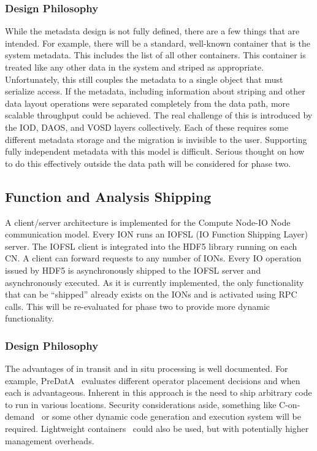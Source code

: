 \documentclass[conference]{IEEEtran} \pdfpagewidth=8.5in
\begin{document}
\subsubsection{Design Philosophy}

While the metadata design is not fully defined, there are a few things that
are intended. For example, there will be a standard, well-known container that
is the system metadata. This includes the list of all other containers. This
container is treated like any other data in the system and striped as
appropriate. Unfortunately, this still couples the metadata to a single object
that must serialize access.  If the metadata, including information about
striping and other data layout operations were separated completely from the
data path, more scalable throughput could be achieved.  The real challenge of
this is introduced by the IOD, DAOS, and VOSD layers collectively. Each of
these requires some different metadata storage and the migration is invisible
to the user.  Supporting fully independent metadata with this model is
difficult. Serious thought on how to do this effectively outside the data path
will be considered for phase two.

\subsection{Function and Analysis Shipping}
\label{sec:fn-shipping}

A client/server architecture is implemented for the Compute Node-IO Node
communication model.  Every ION runs an IOFSL (IO Function Shipping Layer)
server. The IOFSL client is integrated into the HDF5 library running on each
CN. A client can forward requests to any number of IONs. Every IO operation
issued by HDF5 is asynchronously shipped to the IOFSL server and asynchronously
executed. As it is currently implemented, the only functionality that can be
``shipped'' already exists on the IONs and is activated using RPC calls. This
will be re-evaluated for phase two to provide more dynamic functionality.

\subsubsection{Design Philosophy}

The advantages of in transit and in situ processing is well documented. For
example, PreDatA~\cite{zheng:2010:predata} evaluates different operator
placement decisions and when each is advantageous. Inherent in this approach is
the need to ship arbitrary code to run in various locations. Security
considerations aside, something like C-on-demand~\cite{abbasi:2011:c-on-demand}
or some other dynamic code generation and execution system will be required.
Lightweight containers~\cite{merkel:2014:docker} could also be used, but with
potentially higher management overheads.
\end{document}

